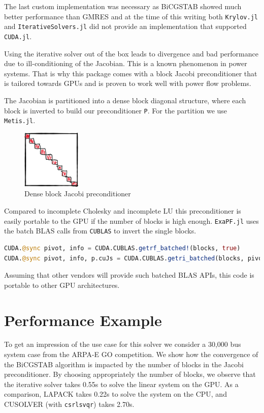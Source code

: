 \documentclass{juliacon}
\begin{document}
The last custom implementation was necessary as BiCGSTAB showed much better
performance than GMRES and at the time of this writing both \lstinline{Krylov.jl} and
\lstinline{IterativeSolvers.jl} did not provide an implementation that supported
\lstinline{CUDA.jl}.

Using the iterative solver out of the box leads to divergence and bad performance due to
ill-conditioning of the Jacobian. This is a known phenomenon in power
systems. That is why this package comes with a block Jacobi preconditioner
that is tailored towards GPUs and is proven to work well with power flow
problems.

The Jacobian is partitioned into a dense block diagonal structure, where each block is inverted to build our preconditioner \lstinline{P}. For the partition we use \lstinline{Metis.jl}.

\begin{figure}
    \includegraphics[width=0.25\textwidth]{figures/gpublocks.png}
    \caption{Dense block Jacobi preconditioner}
    \label{fig:preconditioner}
\end{figure}

Compared to incomplete Cholesky and incomplete LU this preconditioner is easily portable to the GPU if the number of blocks is high enough. \lstinline{ExaPF.jl} uses the batch BLAS calls from \lstinline{CUBLAS} to invert the single blocks.

\begin{lstlisting}[language = Julia]
CUDA.@sync pivot, info = CUDA.CUBLAS.getrf_batched!(blocks, true)
CUDA.@sync pivot, info, p.cuJs = CUDA.CUBLAS.getri_batched(blocks, pivot)
\end{lstlisting}

Assuming that other vendors will provide such batched BLAS APIs, this code is portable to other GPU architectures.

\section{Performance Example}

To get an impression of the use case for this solver we consider a 30,000 bus system case from the ARPA-E GO competition.
We show how the convergence of the BiCGSTAB algorithm is impacted by the number of blocks in the Jacobi preconditioner.
By choosing appropriately the number of blocks, we observe that the iterative solver
takes 0.55s to solve the linear system on the GPU. As a comparison,
LAPACK takes 0.22s to solve the system on the CPU, and CUSOLVER (with \lstinline{csrlsvqr})
takes 2.70s.
\end{document}

